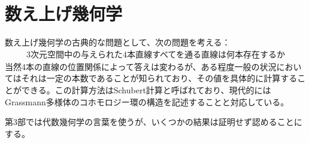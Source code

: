 \documentclass{ltjsreport}
\begin{document}
  \chapter{数え上げ幾何学}

  数え上げ幾何学の古典的な問題として、次の問題を考える：
  \begin{align*}
    \text{3次元空間中の与えられた4本直線すべてを通る直線は何本存在するか}
  \end{align*}
  当然4本の直線の位置関係によって答えは変わるが、ある程度一般の状況においてはそれは一定の本数であることが知られており、その値を具体的に計算することができる。この計算方法はSchubert計算と呼ばれており、現代的にはGrassmann多様体のコホモロジー環の構造を記述することと対応している。

  第3部では代数幾何学の言葉を使うが、いくつかの結果は証明せず認めることにする。

  

  

  
\end{document}

